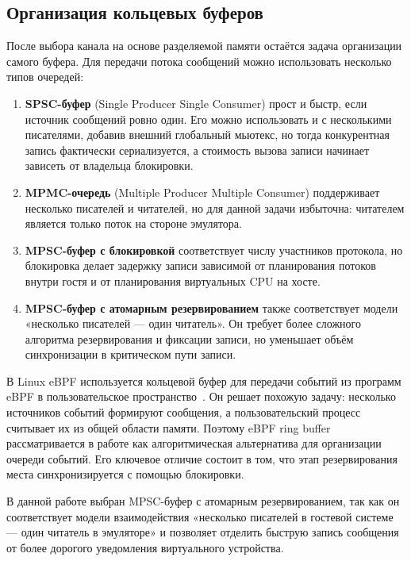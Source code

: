 \subsection{Организация кольцевых буферов}
\label{sec:ch1-ringbuf-alternatives}

После выбора канала на основе разделяемой памяти остаётся задача организации
самого буфера. Для передачи потока сообщений можно использовать несколько типов
очередей:
\begin{enumerate}
    \item \textbf{SPSC-буфер} (Single Producer Single Consumer) прост и быстр,
    если источник сообщений ровно один. Его можно использовать и с несколькими
    писателями, добавив внешний глобальный мьютекс, но тогда конкурентная запись
    фактически сериализуется, а стоимость вызова записи начинает зависеть от
    владельца блокировки.
    \item \textbf{MPMC-очередь} (Multiple Producer Multiple Consumer) поддерживает
    несколько писателей и читателей, но для данной задачи избыточна: читателем
    является только поток на стороне эмулятора.
    \item \textbf{MPSC-буфер с блокировкой} соответствует числу участников
    протокола, но блокировка делает задержку записи зависимой от планирования
    потоков внутри гостя и от планирования виртуальных CPU на хосте.
    \item \textbf{MPSC-буфер с атомарным резервированием} также соответствует
    модели «несколько писателей --- один читатель». Он требует более сложного
    алгоритма резервирования и фиксации записи, но уменьшает объём синхронизации
    в критическом пути записи.
\end{enumerate}

В Linux eBPF используется кольцевой буфер для передачи событий из программ eBPF
в пользовательское пространство~\cite{ebpf_ringbuf}. Он решает похожую задачу:
несколько источников событий формируют сообщения, а пользовательский процесс
считывает их из общей области памяти. Поэтому eBPF ring buffer рассматривается
в работе как алгоритмическая альтернатива для организации очереди событий. Его
ключевое отличие состоит в том, что этап резервирования места синхронизируется
с помощью блокировки.

В данной работе выбран MPSC-буфер с атомарным резервированием, так как он
соответствует модели взаимодействия «несколько писателей в гостевой системе ---
один читатель в эмуляторе» и позволяет отделить быструю запись сообщения от
более дорогого уведомления виртуального устройства.
